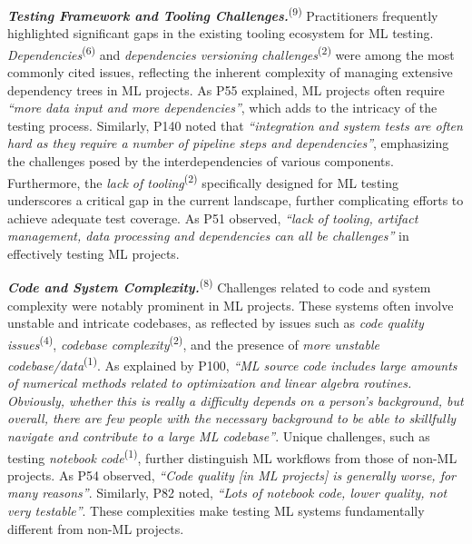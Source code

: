 \textbf{\textit{Testing Framework and Tooling Challenges.}}\textsuperscript{(9)}
Practitioners frequently highlighted significant gaps in the existing tooling ecosystem for ML testing. \textit{Dependencies}\textsuperscript{(6)} and \textit{dependencies versioning challenges}\textsuperscript{(2)} were among the most commonly cited issues, reflecting the inherent complexity of managing extensive dependency trees in ML projects. As P55 explained, ML projects often require \textit{``more data input and more dependencies''}, which adds to the intricacy of the testing process.
Similarly, P140 noted that \textit{``integration and system tests are often hard as they require a number of pipeline steps and dependencies''}, emphasizing the challenges posed by the interdependencies of various components. Furthermore, the \textit{lack of tooling}\textsuperscript{(2)} specifically designed for ML testing underscores a critical gap in the current landscape, further complicating efforts to achieve adequate test coverage. As P51 observed, \textit{``lack of tooling, artifact management, data processing and dependencies can all be challenges''} in effectively testing ML projects.

\textbf{\textit{Code and System Complexity.}}\textsuperscript{(8)}
Challenges related to code and system complexity were notably prominent in ML projects. These systems often involve unstable and intricate codebases, as reflected by issues such as \textit{code quality issues}\textsuperscript{(4)}, \textit{codebase complexity}\textsuperscript{(2)}, and the presence of \textit{more unstable codebase/data}\textsuperscript{(1)}.
As explained by P100, \textit{``ML source code includes large amounts of numerical methods related to optimization and linear algebra routines. Obviously, whether this is really a difficulty depends on a person's background, but overall, there are few people with the necessary background to be able to skillfully navigate and contribute to a large ML codebase''}.
Unique challenges, such as testing \textit{notebook code}\textsuperscript{(1)}, further distinguish ML workflows from those of non-ML projects. As P54 observed, \textit{``Code quality [in ML projects] is generally worse, for many reasons''}. Similarly, P82 noted, \textit{``Lots of notebook code, lower quality, not very testable''}.
These complexities make testing ML systems fundamentally different from non-ML projects.

